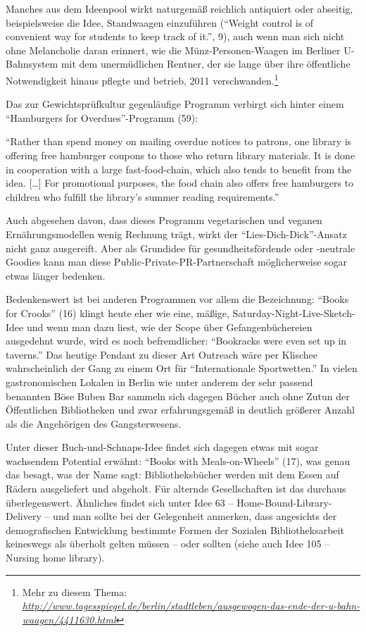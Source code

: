 \documentclass[a4paper,
fontsize=11pt,
oneside,
numbers=noperiodatend,
parskip=half-,
bibliography=totoc,
final
]{scrartcl}
\begin{document}
Manches aus dem Ideenpool wirkt naturgemäß reichlich antiquiert oder
abseitig, beispielsweise die Idee, Standwaagen einzuführen
(\enquote{Weight control is of convenient way for students to keep track
of it.}, 9), auch wenn man sich nicht ohne Melancholie daran erinnert,
wie die Münz-Personen-Waagen im Berliner U-Bahnsystem mit dem
unermüdlichen Rentner, der sie lange über ihre öffentliche Notwendigkeit
hinaus pflegte und betrieb, 2011 verschwanden.\footnote{Mehr zu diesem
  Thema:
  \href{http://www.tagesspiegel.de/berlin/stadtleben/ausgewogen-das-ende-der-u-bahn-waagen/4411630.html}{\emph{http://www.tagesspiegel.de/berlin/stadtleben/ausgewogen-das-ende-der-u-bahn-waagen/4411630.html}}}

Das zur Gewichtsprüfkultur gegenläufige Programm verbirgt sich hinter
einem \enquote{Hamburgers for Overdues}-Programm (59):

\enquote{Rather than spend money on mailing overdue notices to patrons,
one library is offering free hamburger coupons to those who return
library materials. It is done in cooperation with a large
fast-food-chain, which also tends to benefit from the idea.
{[}\ldots{}{]} For promotional purposes, the food chain also offers free
hamburgers to children who fulfill the library's summer reading
requirements.}

Auch abgesehen davon, dass dieses Programm vegetarischen und veganen
Ernährungsmodellen wenig Rechnung trägt, wirkt der
\enquote{Lies-Dich-Dick}-Ansatz nicht ganz ausgereift. Aber als
Grundidee für gesundheitsfördende oder -neutrale Goodies kann man diese
Public-Private-PR-Partnerschaft möglicherweise sogar etwas länger
bedenken.

Bedenkenswert ist bei anderen Programmen vor allem die Bezeichnung:
\enquote{Books for Crooks} (16) klingt heute eher wie eine, mäßige,
Saturday-Night-Live-Sketch-Idee und wenn man dazu liest, wie der Scope
über Gefangenbüchereien ausgedehnt wurde, wird es noch befremdlicher:
\enquote{Bookracks were even set up in taverns.} Das heutige Pendant zu
dieser Art Outreach wäre per Klischee wahrscheinlich der Gang zu einem
Ort für \enquote{Internationale Sportwetten.} In vielen gastronomischen
Lokalen in Berlin wie unter anderem der sehr passend benannten Böse
Buben Bar sammeln sich dagegen Bücher auch ohne Zutun der Öffentlichen
Bibliotheken und zwar erfahrungsgemäß in deutlich größerer Anzahl als
die Angehörigen des Gangsterwesens.

Unter dieser Buch-und-Schnaps-Idee findet sich dagegen etwas mit sogar
wachsendem Potential erwähnt: \enquote{Books with Meals-on-Wheels} (17),
was genau das besagt, was der Name sagt: Bibliotheksbücher werden mit
dem Essen auf Rädern ausgeliefert und abgeholt. Für alternde
Gesellschaften ist das durchaus überlegenswert. Ähnliches findet sich
unter Idee 63 -- Home-Bound-Library-Delivery -- und man sollte bei der
Gelegenheit anmerken, dass angesichts der demografischen Entwicklung
bestimmte Formen der Sozialen Bibliotheksarbeit keineswegs als überholt
gelten müssen -- oder sollten (siehe auch Idee 105 -- Nursing home
library).
\end{document}
